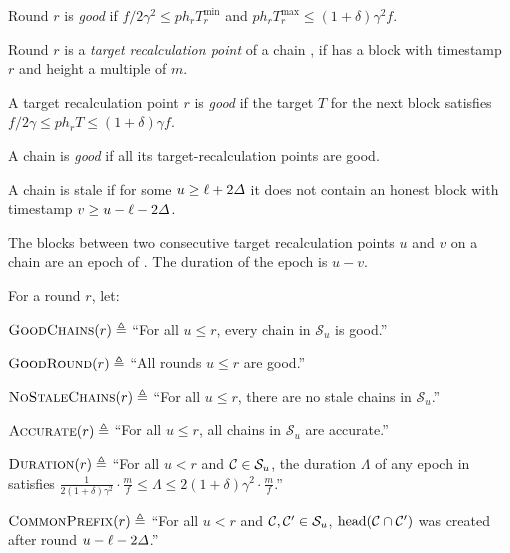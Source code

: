 \begin{definition}
    \begin{cccItemize}[nosep]
        \item Round $r$ is \emph{good} if $f / 2\gamma^2 \le p h_r T^{\min}_r$ and $p h_r T^{\max}_r \le (1 + \delta) \gamma^2 f$.

        \item Round $r$ is a \emph{target recalculation point} of a chain \chain, if \chain has a block with timestamp $r$ and height a multiple of $m$.

        \item A target recalculation point $r$ is \emph{good} if the target $T$ for the next block satisfies $f /2\gamma \le ph_r T \le (1 + \delta)\gamma f$.

        \item A chain is \emph{good} if all its target-recalculation points are good.

        \item A chain is stale if for some $u \ge \ell + 2\varDelta$ it does not contain an honest block with timestamp $v \ge u - \ell - 2\varDelta$.

        \item The blocks between two consecutive target recalculation points $u$ and $v$ on a chain \chain are an epoch of \chain. The duration of the epoch is $u - v$.
    \end{cccItemize}
\end{definition}

\begin{definition} \label{def:security-predicate}
    For a round $r$, let:
    \begin{cccItemize}[nosep]
        \item $\textsc{GoodChains}(r) \triangleq$ ``For all $u \le r$, every chain in $\mathcal{S}_u$ is good.''

        \item $\textsc{GoodRound}(r) \triangleq$ ``All rounds $u \le r$ are good.''

        \item $\textsc{NoStaleChains}(r) \triangleq$ ``For all $u \le r$, there are no stale chains in $\mathcal{S}_u$.''

        \item $\textsc{Accurate}(r) \triangleq$ ``For all $u \le r$,  all chains in $\mathcal{S}_u$ are accurate.''

        \item $\textsc{Duration}(r) \triangleq$ ``For all $u < r$ and $\mathcal{C} \in \mathcal{S}_u$, the duration $\varLambda$ of any epoch in \chain satisfies $\frac{1}{2(1 + \delta)\gamma^2} \cdot \frac{m}{f} \le \varLambda \le 2(1 + \delta)\gamma^2 \cdot \frac{m}{f}$.''

        \item $\textsc{CommonPrefix}(r) \triangleq$ ``For all $u < r$ and $\mathcal{C}, \mathcal{C}' \in \mathcal{S}_u$, $\mathrm{head}(\mathcal{C} \cap \mathcal{C}')$ was created after round $u - \ell - 2\varDelta$.''
    \end{cccItemize}
\end{definition}

